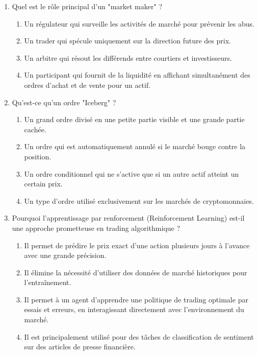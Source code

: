 \documentclass[a4paper,12pt]{article}
\begin{document}
\begin{enumerate}
    \item Quel est le rôle principal d'un "market maker" ?
    \begin{enumerate}[label=(\Alph*)]
        \item Un régulateur qui surveille les activités de marché pour prévenir les abus.
        \item Un trader qui spécule uniquement sur la direction future des prix.
        \item Un arbitre qui résout les différends entre courtiers et investisseurs.
        \item Un participant qui fournit de la liquidité en affichant simultanément des ordres d'achat et de vente pour un actif.
    \end{enumerate}

    \item Qu'est-ce qu'un ordre "Iceberg" ?
    \begin{enumerate}[label=(\Alph*)]
        \item Un grand ordre divisé en une petite partie visible et une grande partie cachée.
        \item Un ordre qui est automatiquement annulé si le marché bouge contre la position.
        \item Un ordre conditionnel qui ne s'active que si un autre actif atteint un certain prix.
        \item Un type d'ordre utilisé exclusivement sur les marchés de cryptomonnaies.
    \end{enumerate}

    \item Pourquoi l'apprentissage par renforcement (Reinforcement Learning) est-il une approche prometteuse en trading algorithmique ?
    \begin{enumerate}[label=(\Alph*)]
        \item Il permet de prédire le prix exact d'une action plusieurs jours à l'avance avec une grande précision.
        \item Il élimine la nécessité d'utiliser des données de marché historiques pour l'entraînement.
        \item Il permet à un agent d'apprendre une politique de trading optimale par essais et erreurs, en interagissant directement avec l'environnement du marché.
        \item Il est principalement utilisé pour des tâches de classification de sentiment sur des articles de presse financière.
    \end{enumerate}
    

\end{enumerate}
\end{document}
